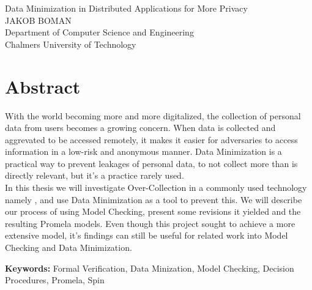 Data Minimization in Distributed Applications for More Privacy\\
JAKOB BOMAN\\
Department of Computer Science and Engineering\\
Chalmers University of Technology \setlength{\parskip}{0.5cm}

\thispagestyle{plain}			%
\setlength{\parskip}{0pt plus 1.0pt}

\section*{Abstract}


With the world becoming more and more digitalized, the collection of personal data from users becomes a growing concern. When data is collected and aggrevated to be accessed remotely, it makes it easier for adversaries to access information in a low-risk and anonymous manner. Data Minimization is a practical way to prevent leakages of personal data, to not collect more than is directly relevant, but it's a practice rarely used. \\ 

In this thesis we will investigate Over-Collection in a commonly used technology namely \wsn, and use Data Minimization as a tool to prevent this. We will describe our process of using Model Checking, present some revisions it yielded and the resulting Promela models. Even though this project sought to achieve a more extensive model, it's findings can still be useful for related work into Model Checking and Data Minimization.











\vfill
\textbf{Keywords:} Formal Verification, Data Minization, Model Checking, Decision Procedures, Promela, Spin

\newpage				%
\thispagestyle{empty}
\mbox{}